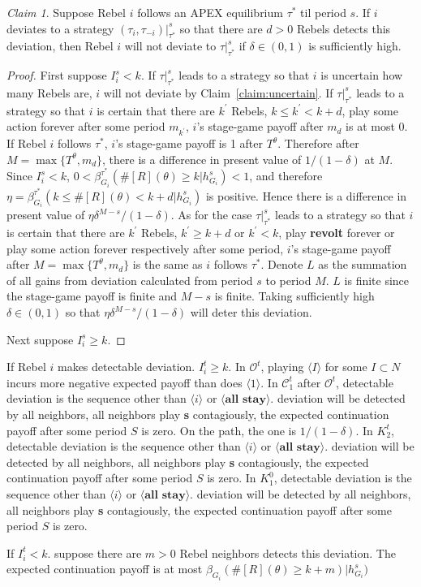 \documentclass[12pt,letter]{article}
\newcommand{\Kappa}{\mathcal{C}}
\newcommand{\Omicron}{\mathcal{O}}
\theoremstyle{definition}
\theoremstyle{remark}
\theoremstyle{claim}
\newtheorem{claim}{Claim}
\begin{document}
\begin{claim} Suppose Rebel $i$ follows an APEX equilibrium $\tau^{*}$ til period $s$. If $i$ deviates to a strategy $(\tau_i,\tau_{-i})|^s_{\tau^{*}}$ so that there are $d>0$ Rebels detects this deviation, then Rebel $i$ will not deviate to $\tau|^s_{\tau^{*}}$ if $\delta\in(0,1)$ is sufficiently high.
\end{claim}

\begin{proof}
First suppose $I^s_i< k$. If $\tau|^s_{\tau^{*}}$ leads to a strategy so that $i$ is uncertain how many Rebels are, $i$ will not deviate by Claim~\ref{claim:uncertain}. If $\tau|^s_{\tau^{*}}$ leads to a strategy so that $i$ is certain that there are $k^{'}$ Rebels, $k\leq k^{'}<k+d$, play some action forever after some period $m_{k^{'}}$, $i$'s stage-game payoff after $m_d$ is at most 0. If Rebel $i$ follows $\tau^{*}$, $i$'s stage-game payoff is 1 after $T^{\theta}$. Therefore after $M=\max\{T^{\theta}, m_d\}$, there is a difference in present value of $1/(1-\delta)$ at $M$. Since $I^s_i< k$, $0<\beta^{\tau^{*}}_{G_i}(\#[R](\theta)\geq k|h^s_{G_i})<1$, and therefore $\eta=\beta^{\tau^{*}}_{G_i}(k\leq \#[R](\theta)< k+d|h^s_{G_i})$ is positive. Hence there is a difference in present value of $\eta\delta^{M-s}/(1-\delta)$. As for the case $\tau|^s_{\tau^{*}}$ leads to a strategy so that $i$ is certain that there are $k^{'}$ Rebels, $k^{'}\geq k+d$ or $k^{'}<k$, play \textbf{revolt} forever or play some action forever respectively after some period, $i$'s stage-game payoff after $M=\max\{T^{\theta},m_d\}$ is the same as $i$ follows $\tau^{*}$. Denote $L$ as the summation of all gains from deviation calculated from period $s$ to period $M$. $L$ is finite since the stage-game payoff is finite and $M-s$ is finite. Taking sufficiently high $\delta\in(0,1)$ so that $\eta\delta^{M-s}/(1-\delta)$ will deter this deviation.

Next suppose $I^s_i\geq k$.
\end{proof}

If Rebel $i$ makes detectable deviation. $I^t_i\geq k$. In $\Omicron^t$, playing $\langle I \rangle$ for some $I\subset N$ incurs more negative expected payoff than does $\langle 1 \rangle$. In $\Kappa^t_{1}$ after $\Omicron^t$, detectable deviation is the sequence other than $\langle i \rangle$ or $\langle \textbf{all stay} \rangle$. deviation will be detected by all neighbors, all neighbors play \textbf{s} contagiously, the expected continuation payoff after some period $S$ is zero. On the path, the one is $1/(1-\delta)$. In $K^t_2$, detectable deviation is the sequence other than $\langle i \rangle$ or $\langle \textbf{all stay} \rangle$. deviation will be detected by all neighbors, all neighbors play \textbf{s} contagiously, the expected continuation payoff after some period $S$ is zero. In $K^0_1$, detectable deviation is the sequence other than $\langle i \rangle$ or $\langle \textbf{all stay} \rangle$. deviation will be detected by all neighbors, all neighbors play \textbf{s} contagiously, the expected continuation payoff after some period $S$ is zero.

If $I^t_i<k$. suppose there are $m>0$ Rebel neighbors detects this deviation. The expected continuation payoff is at most $\beta_{G_i}(\#[R](\theta)\geq k+m)|h^s_{G_i})$ 
\end{document}
